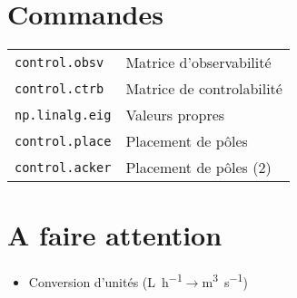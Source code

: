 \documentclass[]{article}
\begin{document}
\begin{multicols}{3}






















\section{Commandes}
\begin{tabular}{ll}
\verb!control.obsv! & Matrice d'observabilité\\
\verb!control.ctrb! & Matrice de controlabilité\\
\verb!np.linalg.eig! & Valeurs propres\\
\verb!control.place! & Placement de pôles\\
\verb!control.acker! & Placement de pôles (2)\\

\end{tabular}
\section{A faire attention}
\begin{mdframed}[linewidth=1pt,linecolor=OrangeRed]
\begin{itemize}
\item Conversion d'unités (\si{\liter\per\hour}$\longrightarrow$\si{\cubic\meter\per\second})
\end{itemize}
\end{mdframed}


\end{multicols}
\end{document}
